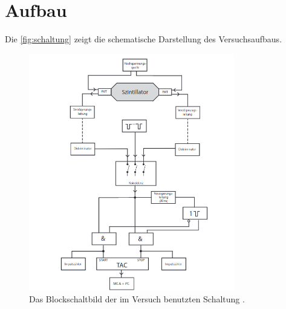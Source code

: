 \section{Aufbau}
\label{sec:Aufbau}

\noindent Die \autoref{fig:schaltung} zeigt die schematische Darstellung des Versuchsaufbaus. 

\begin{figure}[h]
    \centering
    \includegraphics[width=0.8\textwidth]{bilder/blockschaltbild.png}
    \caption{Das Blockschaltbild der im Versuch benutzten Schaltung \cite{anleitung}.}
    \label{fig:schaltung}
\end{figure}

